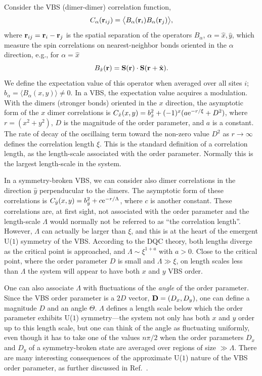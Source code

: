\documentclass[range]{ar2e}
\begin{document}
Consider the VBS (dimer-dimer) correlation function,
\begin{equation}
C_{\alpha} ({\bf r}_{ij}) = \bigl \langle B_\alpha({\bf r}_i)B_\alpha({\bf r}_j) \bigr \rangle, 
\label{cddef}
\end{equation}
where ${\bf r}_{ij}={\bf r}_{i}-{\bf r}_{j}$ is the spatial separation of the operators $B_\alpha$, $\alpha=\hat x,\hat y$,
which measure the spin correlations on nearest-neighbor bonds oriented in the $\alpha$ direction, e.g., for $\alpha=\hat x$
\begin{equation}
B_{\hat x}({\bf r})={\bf S}({\bf r}) \cdot {\bf S}({\bf r}+\hat {\bf x}).
\label{bxdef}
\end{equation}
We define the expectation value of this operator when averaged over all sites $i$; $b_\alpha=\langle B_{\alpha}(x,y)\rangle \not = 0$. In a VBS, the 
expectation value acquires a modulation. With the dimers (stronger bonds) oriented in the $x$ direction, the asymptotic form of the $x$ dimer correlations 
is $C_{\hat x}(x,y) = b_{\hat x}^2+(-1)^{x}(a{\rm e}^{-r/\xi}+D^2)$, where $r=(x^2+y^2)$, $D$ is the magnitude of the order parameter, and $a$ 
is a constant. The rate of decay of the oscillaing term toward the non-zero value $D^2$ as $r\to \infty$ defines the correlation length $\xi$. This is the 
standard definition of a correlation length, as the length-scale associated with the order parameter. Normally this is the largest length-scale in the system. 

In a symmetry-broken VBS, we can consider also dimer correlations in the direction $\hat y$ perpenducular to the dimers. The asymptotic form of these correlations 
is $C_{\hat y}(x,y) = b_{\hat y}^2 + c{\rm e}^{-r/\Lambda}$, where $c$ is another constant. These correlations are, at first sight, not associated with the order
parameter and the length-scale $\Lambda$ would normally not be referred to as ``the correlation length''. However, $\Lambda$ can actually be larger than 
$\xi$, and this is at the heart of the emergent U($1$) symmetry of the VBS. According to the DQC theory, both lengths diverge as the critical point is 
approached, and $\Lambda \sim \xi^{1+a}$ with $a>0$. Close to the critical point, where the order parameter $D$ is small and $\Lambda \gg \xi$, on 
length scales less than $\Lambda$ the system will appear to have both $x$ and $y$ VBS order.

One can also associate $\Lambda$ with fluctuations of the {\it angle} of the order parameter. Since the VBS order parameter is a $2D$ vector, ${\bf D}= (D_x,D_y)$, 
one can define a magnitude $D$ and an angle $\Theta$. $\Lambda$ defines a length scale below which the order parameter exhibits U($1$) symmetry---the system
not only has both $x$ and $y$ order up to this length scale, but one can think of the angle as fluctuating uniformly, even though it has to take one of the 
values $n\pi/2$ when the order parameters $D_x$ and $D_y$ of a symmetry-broken state are averaged over regions of size $\gg \Lambda$. There are many interesting 
consequences of the approximate U($1$) nature of the VBS order parameter, as further discussed in Ref.~\cite{Sandvik12}.
\end{document}
